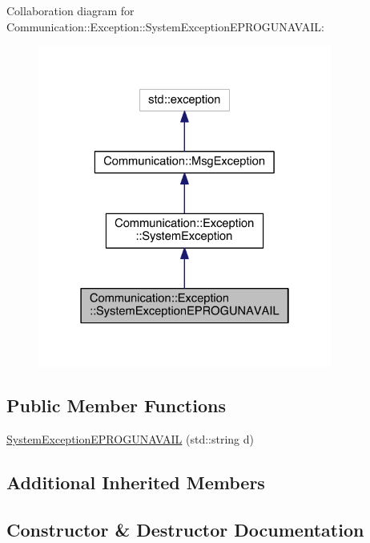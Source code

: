 Collaboration diagram for Communication\+:\+:Exception\+:\+:System\+Exception\+E\+P\+R\+O\+G\+U\+N\+A\+V\+A\+I\+L\+:\nopagebreak
\begin{figure}[H]
\begin{center}
\leavevmode
\includegraphics[width=274pt]{class_communication_1_1_exception_1_1_system_exception_e_p_r_o_g_u_n_a_v_a_i_l__coll__graph}
\end{center}
\end{figure}
\subsection*{Public Member Functions}
\begin{DoxyCompactItemize}
\item 
\hyperlink{class_communication_1_1_exception_1_1_system_exception_e_p_r_o_g_u_n_a_v_a_i_l_aa0e8f67df0a7276a2f0e5da22f59eaad}{System\+Exception\+E\+P\+R\+O\+G\+U\+N\+A\+V\+A\+I\+L} (std\+::string d)
\end{DoxyCompactItemize}
\subsection*{Additional Inherited Members}


\subsection{Constructor \& Destructor Documentation}
\hypertarget{class_communication_1_1_exception_1_1_system_exception_e_p_r_o_g_u_n_a_v_a_i_l_aa0e8f67df0a7276a2f0e5da22f59eaad}{}
